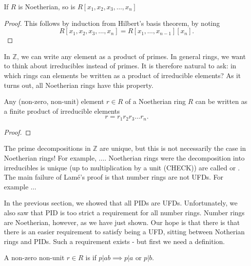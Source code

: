 \begin{corollary}
If $R$ is Noetherian, so is $R[x_1,x_2,x_3,\dots,x_n]$
\end{corollary}
\begin{proof}
This follows by induction from Hilbert's basis theorem, by noting $$R[x_1,x_2,x_3,\dots,x_n]=R[x_1,\dots,x_{n-1}][x_n].$$
\end{proof}

In $\mathbb{Z}$, we can write any element as a product of primes. In general rings, we want to think about irreducibles instead of primes. It is therefore natural to ask: in which rings can elements be written as a product of irreducible elements? As it turns out, all Noetherian rings have this property.

\begin{lemma}\label{noetherian-irreducible-elements}
Any (non-zero, non-unit) element $r\in R$ of a Noetherian ring $R$ can be written as a finite product of irreducible elements
$$r=r_1r_2r_3\dots r_n.$$
\end{lemma}
\begin{proof}

\end{proof}

\begin{remark}
The prime decompositions in $\mathbb{Z}$ are unique, but this is not necessarily the case in Noetherian rings! For example, $\dots$. Noetherian rings were the decomposition into irreducibles is unique (up to multiplication by a unit (CHECK)) are called  or . The main failure of Lamé's proof is that number rings are not UFDs. For example $\dots$
\end{remark}

\begin{proposition}

\end{proposition}

In the previous section, we showed that all PIDs are UFDs. Unfortunately, we also saw that PID is too strict a requirement for all number rings. Number rings are Noetherian, however, as we have just shown. Our hope is that there is that there is an easier requirement to satisfy being a UFD, sitting between Notherian rings and PIDs. Such a requirement exists - but first we need a definition.

\begin{definition}
A non-zero non-unit $r\in R$ is  if $p|ab\implies p|a$ or $p|b$.
\end{definition}

